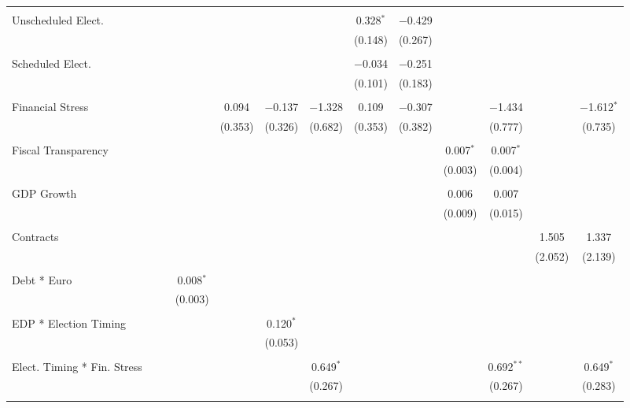 \begin{table}[!htbp]
\begin{tabular}{@{\extracolsep{5pt}}lcccccccccccc}
  & & & & & & & & & & & & \\ 
 Unscheduled Elect. &  &  &  &  &  &  & 0.328$^{*}$ & $-$0.429 &  &  &  &  \\ 
  &  &  &  &  &  &  & (0.148) & (0.267) &  &  &  &  \\ 
  & & & & & & & & & & & & \\ 
 Scheduled Elect. &  &  &  &  &  &  & $-$0.034 & $-$0.251 &  &  &  &  \\ 
  &  &  &  &  &  &  & (0.101) & (0.183) &  &  &  &  \\ 
  & & & & & & & & & & & & \\ 
 Financial Stress &  &  &  & 0.094 & $-$0.137 & $-$1.328 & 0.109 & $-$0.307 &  & $-$1.434 &  & $-$1.612$^{*}$ \\ 
  &  &  &  & (0.353) & (0.326) & (0.682) & (0.353) & (0.382) &  & (0.777) &  & (0.735) \\ 
  & & & & & & & & & & & & \\ 
 Fiscal Transparency &  &  &  &  &  &  &  &  & 0.007$^{*}$ & 0.007$^{*}$ &  &  \\ 
  &  &  &  &  &  &  &  &  & (0.003) & (0.004) &  &  \\ 
  & & & & & & & & & & & & \\ 
 GDP Growth &  &  &  &  &  &  &  &  & 0.006 & 0.007 &  &  \\ 
  &  &  &  &  &  &  &  &  & (0.009) & (0.015) &  &  \\ 
  & & & & & & & & & & & & \\ 
 Contracts &  &  &  &  &  &  &  &  &  &  & 1.505 & 1.337 \\ 
  &  &  &  &  &  &  &  &  &  &  & (2.052) & (2.139) \\ 
  & & & & & & & & & & & & \\ 
 Debt * Euro &  &  & 0.008$^{*}$ &  &  &  &  &  &  &  &  &  \\ 
  &  &  & (0.003) &  &  &  &  &  &  &  &  &  \\ 
  & & & & & & & & & & & & \\ 
 EDP * Election Timing &  &  &  &  & 0.120$^{*}$ &  &  &  &  &  &  &  \\ 
  &  &  &  &  & (0.053) &  &  &  &  &  &  &  \\ 
  & & & & & & & & & & & & \\ 
 Elect. Timing * Fin. Stress &  &  &  &  &  & 0.649$^{*}$ &  &  &  & 0.692$^{**}$ &  & 0.649$^{*}$ \\ 
  &  &  &  &  &  & (0.267) &  &  &  & (0.267) &  & (0.283) \\ 
  & & & & & & & & & & & & \\ 

\end{tabular}
\end{table}
